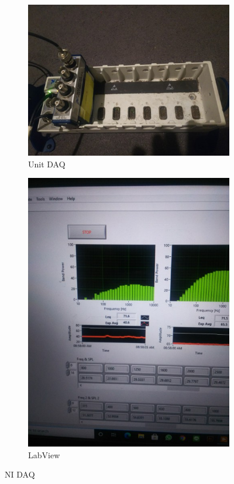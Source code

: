 \documentclass[12pt,]{article}
\begin{document}
\begin{itemize}
		\begin{figure}[!ht]
			\centering
			\begin{subfigure}[b]{0.3\textwidth}
				\includegraphics[width=\textwidth]{images/ni_daq}
				\caption{Unit DAQ}
			\end{subfigure}
			\begin{subfigure}[b]{0.3\textwidth}
				\includegraphics[width=\textwidth]{images/labview_0}
				\caption{LabView}
			\end{subfigure}
			\caption{NI DAQ}
		\end{figure}
	

\end{itemize}
\end{document}
